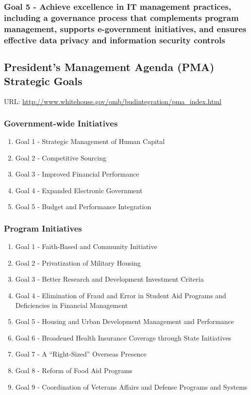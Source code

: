 \documentclass[11pt]{article}
\begin{document}
\subsubsection{Goal 5 - Achieve excellence in IT management practices, including a governance process that complements program management, supports e-government initiatives, and ensures effective data privacy and information security controls}
\label{sec:org474ac31}

\subsection{President’s Management Agenda (PMA) Strategic Goals}
\label{sec:org3068219}
URL: \url{http://www.whitehouse.gov/omb/budintegration/pma\_index.html}
\subsubsection{Government-wide Initiatives}
\label{sec:org15800aa}
\begin{enumerate}
\item Goal 1 - Strategic Management of Human Capital
\label{sec:org0964e6a}
\item Goal 2 - Competitive Sourcing
\label{sec:org179f059}
\item Goal 3 - Improved Financial Performance
\label{sec:org6ed8677}
\item Goal 4 - Expanded Electronic Government
\label{sec:org5171de0}
\item Goal 5 - Budget and Performance Integration
\label{sec:orgd78cd3d}
\end{enumerate}
\subsubsection{Program Initiatives}
\label{sec:orgff84314}
\begin{enumerate}
\item Goal 1 - Faith-Based and Community Initiative
\label{sec:org407b0d0}
\item Goal 2 - Privatization of Military Housing
\label{sec:org5b41073}
\item Goal 3 - Better Research and Development Investment Criteria
\label{sec:org730e748}
\item Goal 4 - Elimination of Fraud and Error in Student Aid Programs and Deficiencies in Financial Management
\label{sec:org8bd1e2c}
\item Goal 5 - Housing and Urban Development Management and Performance
\label{sec:org3d93a6b}
\item Goal 6 - Broadened Health Insurance Coverage through State Initiatives
\label{sec:orgecdd161}
\item Goal 7 - A “Right-Sized” Overseas Presence
\label{sec:orga2c29ee}
\item Goal 8 - Reform of Food Aid Programs
\label{sec:org3e11deb}
\item Goal 9 - Coordination of Veterans Affairs and Defense Programs and Systems
\label{sec:org2866424}
\end{enumerate}
\end{document}
